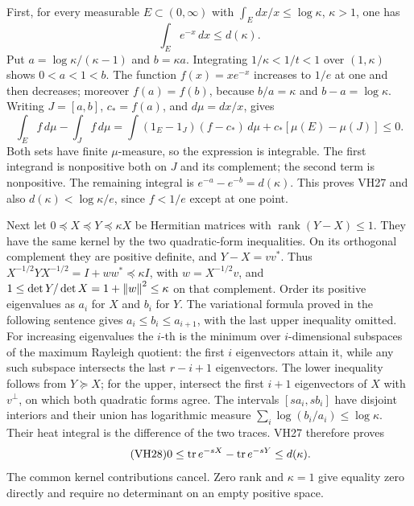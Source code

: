 \documentclass[11pt]{article}
\begin{document}
First, for every measurable \(E\subset(0,\infty)\) with
\(\int_E dx/x\le\log\kappa\), \(\kappa>1\), one has
\begin{equation}\tag{VH27}\label{hvh:VH27}
\int_E e^{-x}\,dx\le d(\kappa).
\end{equation}
Put \(a=\log\kappa/(\kappa-1)\) and \(b=\kappa a\).
Integrating \(1/\kappa<1/t<1\) over \((1,\kappa)\) shows
\(0<a<1<b\). The function \(f(x)=xe^{-x}\) increases to \(1/e\)
at one and then decreases; moreover \(f(a)=f(b)\), because
\(b/a=\kappa\) and \(b-a=\log\kappa\).
Writing \(J=[a,b]\), \(c_*=f(a)\), and \(d\mu=dx/x\), gives
\[
\int_E f\,d\mu-\int_J f\,d\mu
=\int(1_E-1_J)(f-c_*)\,d\mu
+c_*[\mu(E)-\mu(J)]\le0.
\]
Both sets have finite \(\mu\)-measure, so the expression is integrable.
The first integrand is nonpositive both on \(J\) and its complement;
the second term is nonpositive. The remaining integral is
\(e^{-a}-e^{-b}=d(\kappa)\). This proves VH27 and also
\(d(\kappa)<\log\kappa/e\), since \(f<1/e\) except at one point.

Next let \(0\preceq X\preceq Y\preceq\kappa X\) be Hermitian
matrices with \(\operatorname{rank}(Y-X)\le1\). They have the same
kernel by the two quadratic-form inequalities. On its orthogonal
complement they are positive definite, and
\(Y-X=vv^*\). Thus
\(X^{-1/2}YX^{-1/2}=I+ww^*\preceq\kappa I\), with
\(w=X^{-1/2}v\), and
\(1\le\det Y/\det X=1+\left\lVert w\right\rVert^2\le\kappa\) on that complement.
Order its positive eigenvalues as \(a_i\) for \(X\) and \(b_i\) for
\(Y\). The variational formula proved in the following sentence gives
\(a_i\le b_i\le a_{i+1}\), with the last upper inequality omitted.
For increasing eigenvalues the \(i\)-th is the minimum over
\(i\)-dimensional subspaces of the maximum Rayleigh quotient: the
first \(i\) eigenvectors attain it, while any such subspace intersects
the last \(r-i+1\) eigenvectors. The lower inequality follows from
\(Y\succeq X\); for the upper, intersect the first \(i+1\) eigenvectors
of \(X\) with \(v^\perp\), on which both quadratic forms agree.
The intervals \([sa_i,sb_i]\) have disjoint interiors and their union
has logarithmic measure \(\sum_i\log(b_i/a_i)\le\log\kappa\).
Their heat integral is the difference of the two traces. VH27 therefore
proves
\begin{equation}\tag{VH28}\label{hvh:VH28}
0\le\operatorname{tr} e^{-sX}-\operatorname{tr} e^{-sY}\le d(\kappa).
\end{equation}
The common kernel contributions cancel. Zero rank and \(\kappa=1\)
give equality zero directly and require no determinant on an empty
positive space.
\end{document}
